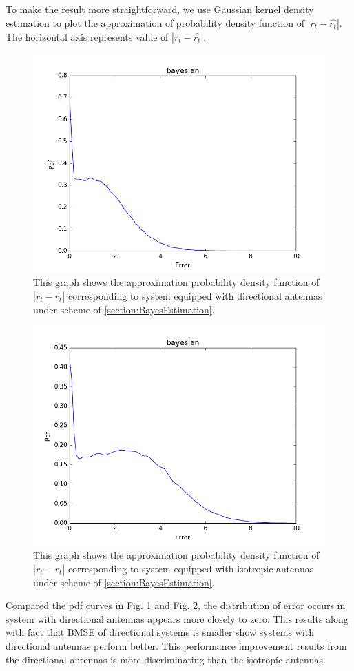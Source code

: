 To make the result more straightforward, we use Gaussian kernel density estimation to plot the approximation of probability density function of $|r_{t}-\hat{r_{t}}|$.
The horizontal axis represents value of $|r_{t}-\hat{r_{t}}|$.
\begin{figure}[]
	\centering
	\includegraphics[scale=0.5]{Figures/bayesrtdir.png}
	\caption{This graph shows the approximation probability density function of $|r_{t}-\hat{r_{t}}|$ corresponding to system equipped with directional antennas under scheme of \ref{section:BayesEstimation}. }
	\label{figure: BayesRtdir}
\end{figure}
\begin{figure}[]
	\centering
	\includegraphics[scale=0.5]{Figures/bayesrtomni.png}
	\caption{This graph shows the approximation probability density function of $|r_{t}-\hat{r_{t}}|$ corresponding to system equipped with isotropic antennas under scheme of \ref{section:BayesEstimation}. }
	\label{figure: BayesRtomni}
\end{figure}
Compared the pdf curves in Fig. \ref{figure: BayesRtdir} and Fig. \ref{figure: BayesRtomni}, the distribution of error occurs in system with directional antennas appears more closely to zero. This results along with fact that BMSE of directional systems is smaller show systems with directional antennas perform better. This performance improvement results from the directional antennas is more discriminating than the isotropic antennas. 

